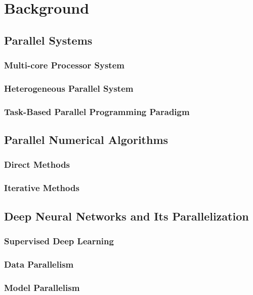 \chapter{Background}
\label{chap:background}

\section{Parallel Systems}
\subsection{Multi-core Processor System}
\subsection{Heterogeneous Parallel System}
\subsection{Task-Based Parallel Programming Paradigm}

\section{Parallel Numerical Algorithms}
\subsection{Direct Methods}
\subsection{Iterative Methods}

\section{Deep Neural Networks and Its Parallelization}
\subsection{Supervised Deep Learning}
\subsection{Data Parallelism}
\subsection{Model Parallelism}
